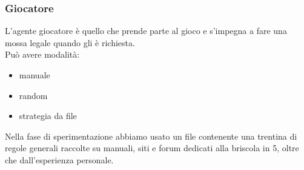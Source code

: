 \documentclass{beamer}
\newcommand*\lista{\item[$\diamondsuit$]}
\begin{document}

\begin{frame}
   \frametitle{Giocatore}
   L'agente giocatore è quello che prende parte al gioco e s'impegna a fare una mossa legale quando gli è richiesta.\\
   \vfill
   \pause   
   Può avere modalità:
   \begin{itemize}
      \lista manuale
      \lista random
      \lista strategia da file
   \end{itemize}
   \vfill
   \pause
   Nella fase di sperimentazione abbiamo usato un file contenente una trentina di regole generali raccolte su manuali, siti e forum dedicati alla briscola in 5, oltre che dall'esperienza personale.
\end{frame}

\end{document}
